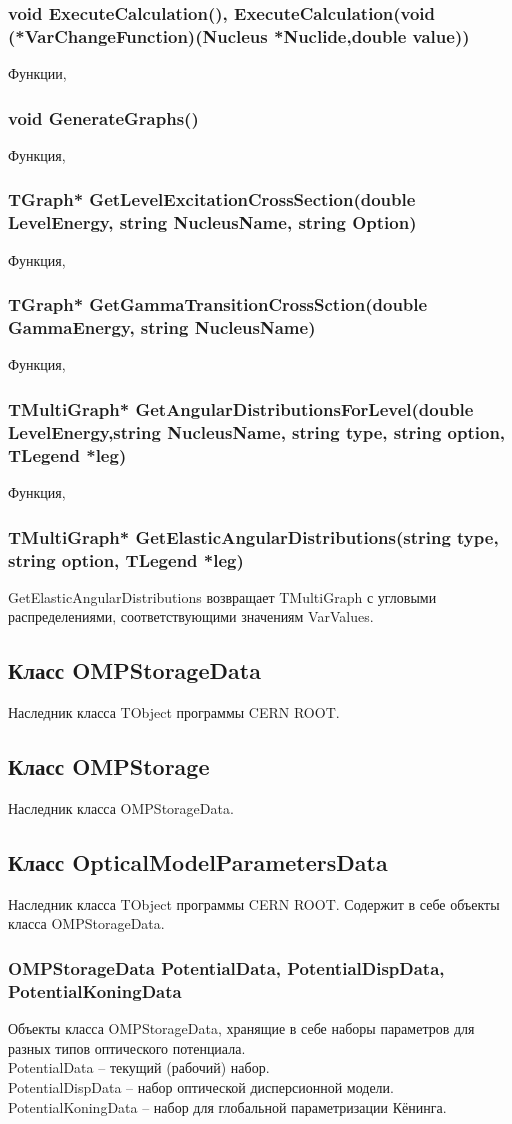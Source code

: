 \documentclass[a4paper,12pt]{extarticle}
\begin{document}
\subsubsection{void ExecuteCalculation(), ExecuteCalculation(void (*VarChangeFunction)(Nucleus *Nuclide,double value))}
Функции, 
\subsubsection{void GenerateGraphs()}
Функция, 
\subsubsection{TGraph* GetLevelExcitationCrossSection(double LevelEnergy, string NucleusName, string Option)}
Функция, 
\subsubsection{TGraph* GetGammaTransitionCrossSction(double GammaEnergy, string NucleusName)}
Функция, 
\subsubsection{TMultiGraph* GetAngularDistributionsForLevel(double LevelEnergy,string NucleusName, string type, string option, TLegend *leg)}
Функция, 
\subsubsection{TMultiGraph* GetElasticAngularDistributions(string type, string option, TLegend *leg)}
GetElasticAngularDistributions возвращает TMultiGraph с угловыми распределениями, соответствующими значениям VarValues.
\subsection{Класс OMPStorageData}
Наследник класса TObject программы CERN ROOT.
\subsection{Класс OMPStorage}
Наследник класса OMPStorageData.
\subsection{Класс OpticalModelParametersData}
Наследник класса TObject программы CERN ROOT. Содержит в себе объекты класса OMPStorageData.
\subsubsection{OMPStorageData PotentialData, PotentialDispData, PotentialKoningData}
Объекты класса OMPStorageData, хранящие в себе наборы параметров для разных типов оптического потенциала.\\
PotentialData -- текущий (рабочий) набор.\\
PotentialDispData -- набор оптической дисперсионной модели.\\
PotentialKoningData -- набор для глобальной параметризации Кёнинга.
\end{document}
